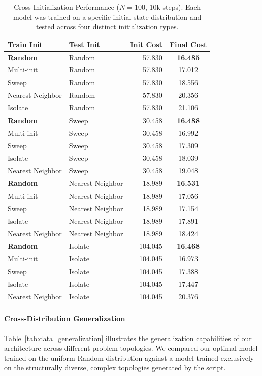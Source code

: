 \documentclass[letterpaper]{article} %
\begin{document}
\begin{table}[t]
\centering
\small
\caption{Cross-Initialization Performance ($N=100$, 10k steps). Each model was trained on a specific initial state distribution and tested across four distinct initialization types.}
\label{tab:init_generalization}
\begin{tabular}{l l r c}
\toprule
\textbf{Train Init} & \textbf{Test Init} & \textbf{Init Cost} & \textbf{Final Cost} \\
\midrule
\textbf{Random} & Random & 57.830 & \textbf{16.485} \\
Multi-init & Random & 57.830 & 17.012 \\
Sweep & Random & 57.830 & 18.556 \\
Nearest Neighbor & Random & 57.830 & 20.356 \\
Isolate & Random & 57.830 & 21.106 \\
\midrule
\textbf{Random} & Sweep  & 30.458 & \textbf{16.488} \\
Multi-init & Sweep  & 30.458 & 16.992 \\
Sweep & Sweep  & 30.458 & 17.309 \\
Isolate & Sweep  & 30.458 & 18.039 \\
Nearest Neighbor & Sweep  & 30.458 & 19.048 \\
\midrule
\textbf{Random} & Nearest Neighbor & 18.989 & \textbf{16.531} \\
Multi-init & Nearest Neighbor & 18.989 & 17.056 \\
Sweep & Nearest Neighbor & 18.989 &  17.154 \\
Isolate & Nearest Neighbor & 18.989 & 17.891 \\
Nearest Neighbor & Nearest Neighbor & 18.989 & 18.424 \\
\midrule
\textbf{Random} & Isolate & 104.045 & \textbf{16.468} \\
Multi-init & Isolate & 104.045 & 16.973 \\
Sweep & Isolate & 104.045 & 17.388 \\
Isolate & Isolate & 104.045 & 17.447 \\
Nearest Neighbor & Isolate & 104.045 & 20.376 \\
\bottomrule
\end{tabular}
\end{table}

\paragraph{Cross-Distribution Generalization}
Table~\ref{tab:data_generalization} illustrates the generalization capabilities of our architecture across different problem topologies. We compared our optimal model trained on the uniform Random distribution \citep{nazari_reinforcement_2018} against a model trained exclusively on the structurally diverse, complex topologies generated by the \citet{queiroga_10000_nodate} script.
\end{document}
